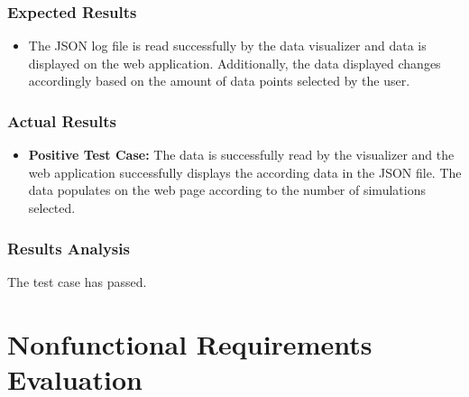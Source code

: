 \documentclass[12pt, titlepage]{article}
\begin{document}
\subsubsection{Expected Results}
\begin{itemize}
    \item The JSON log file is read successfully by the data visualizer and data is displayed on the web application. Additionally, the data displayed changes accordingly based on the amount of data points selected by the user.
\end{itemize}
\subsubsection{Actual Results}
\begin{itemize}
    \item \textbf{Positive Test Case:} The data is successfully read by the visualizer and the web application successfully displays the according data in the JSON file. The data populates on the web page according to the number of simulations selected.
\end{itemize}
\subsubsection{Results Analysis}
The test case has passed.
\section{Nonfunctional Requirements Evaluation}
\end{document}
